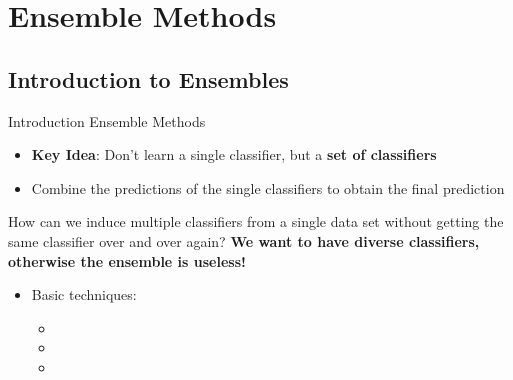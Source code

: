 \section{Ensemble Methods}

\subsection{Introduction to Ensembles}

\begin{frame}{Introduction Ensemble Methods}{}
	\begin{itemize}
		\item \textbf{Key Idea}: Don't learn a single classifier, but a \textbf{set of classifiers}
		\item Combine the predictions of the single classifiers to obtain the final prediction
	\end{itemize}
		
	\begin{boxBlueNoFrame}
		\footnotesize
		 How can we induce multiple classifiers from a single data set without getting
		the same classifier over and over again? \textbf{We want to have diverse classifiers,
		otherwise the ensemble is useless!}	
	\end{boxBlueNoFrame}
		
	\begin{itemize}
		\item Basic techniques:
		\begin{itemize}
			\item {}
			\item {}
			\item {}
		\end{itemize}
	\end{itemize}
\end{frame}


